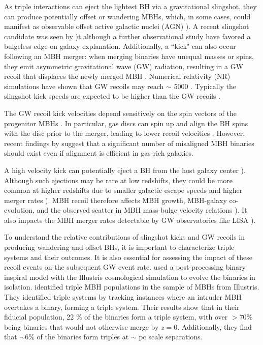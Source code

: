 \documentclass{book}
\begin{document}
As triple interactions can eject the lightest BH via a gravitational slingshot, they can produce potentially offset or wandering MBHs, which, in some cases, could manifest as observable offset active galactic nuclei (AGN) \citep{barrows_spatially_2016}). A recent slingshot candidate was seen by \citep{vanDokkum2023})t although a further observational study \citep{Montes2024} have favored a bulgeless edge-on  galaxy explanation. Additionally, a ``kick" can also occur following an MBH merger: when merging binaries have unequal masses or spins, they emit asymmetric gravitational wave (GW) radiation, resulting in a GW recoil that displaces the newly merged MBH \citep{bekenstein_gravitational-radiation_1973,Campanelli_2007}. Numerical relativity (NR) simulations have shown that GW recoils may reach $\sim$ 5000 \kms \citep{Campanelli_2007,lousto_orbital_2011}. Typically the slingshot kick speeds are expected to be higher than the GW recoils \citep{hoffman_dynamics_2007,Kesden2010}. 

The GW recoil kick velocities depend sensitively on the spin vectors of the progenitor MBHs \citep{Gonz_lez_2007,Campanelli_2007,Brugmann_2008,Kesden2010,Lousto_2012,Berti_2012,Gerosa_2018}. In particular, gas discs can spin up and align the BH spins with the disc prior to the merger, leading to lower recoil velocities \citep{Scheuer1996,Martin_2007,Bogdanovi__2007,Martin2009,Tremaine2014}. However, recent findings by \citet{sayeb_massive_2021} suggest that a significant number of misaligned MBH binaries should exist even if alignment is efficient in gas-rich galaxies.

A high velocity kick can potentially eject a BH from the host galaxy center \citep{Lousto_2012,Gerosa_2014,Schnittman_2007,Ricarte2021}). Although such ejections may be rare at low redshifts, they could be more common at higher redshifts due to smaller galactic escape speeds and higher merger rates \citep{volonteri_assembly_2003,Blecha2016}). MBH recoil therefore affects MBH growth, MBH-galaxy co-evolution, and the observed scatter in MBH mass-bulge velocity relations \citep{Volonteri_2007,gualandris_ejection_2008,blecha_recoiling_2011}). It also impacts the MBH merger rates detectable by GW observatories like LISA \citep{Sesana_2009}).

To understand the relative contributions of slingshot kicks and GW recoils in producing wandering and offset BHs, it is important to characterize triple systems and their outcomes.  It is also essential for assessing the impact of these recoil events on the subsequent GW event rate. \citet{Kelley_2017a} used a post-processing binary inspiral model with the Illustris cosmological simulation to evolve the binaries in isolation. \citet{sayeb_mbh_2023} identified triple MBH populations in the sample of MBHs from Illustris. They identified triple systems by tracking instances where an intruder MBH overtakes a binary, forming a triple system. Their results show that in their fiducial population, 22 \% of the binaries form a triple system, with over $> 70 \%$ being binaries that would not otherwise merge by $z=0$. Additionally, they find that $\sim 6 \%$ of the binaries form triples at $\sim$ pc scale separations. 
\end{document}

